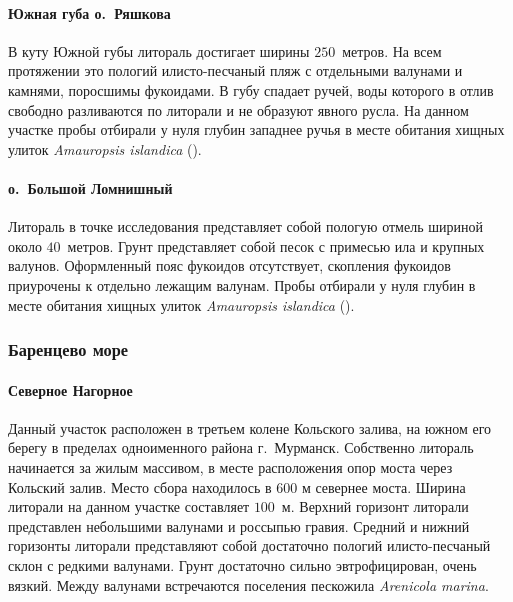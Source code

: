 \paragraph{Южная губа о.~Ряшкова}
В куту Южной губы литораль достигает ширины $250$~метров. 
На всем протяжении это пологий илисто-песчаный пляж с отдельными валунами и камнями, поросшимы фукоидами.
В губу спадает ручей, воды которого в отлив свободно разливаются по литорали и не образуют явного русла.
На данном участке пробы отбирали у нуля глубин западнее ручья в месте обитания хищных улиток \textit{Amauropsis islandica} (\cite{Aristov_Granovich_2011}).


\paragraph{о.~Большой Ломнишный}
Литораль в точке исследования представляет собой пологую отмель шириной около $40$~метров.
Грунт представляет собой песок с примесью ила и крупных валунов.
Оформленный пояс фукоидов отсутствует, скопления фукоидов приурочены к отдельно лежащим валунам.
Пробы отбирали у нуля глубин в месте обитания хищных улиток \textit{Amauropsis islandica} (\cite{Aristov_Granovich_2011}).



            \subsubsection{Баренцево море}

            \paragraph{Северное Нагорное}
Данный участок расположен в третьем колене Кольского залива, на южном его берегу в пределах одноименного района г.~Мурманск. 
Собственно литораль начинается за жилым массивом, в месте расположения опор моста через Кольский залив. 
Место сбора находилось в 600 м севернее моста. 
Ширина литорали на данном участке составляет $100$~м. 
Верхний горизонт литорали представлен небольшими валунами и россыпью гравия. 
Средний и нижний горизонты литорали представляют собой достаточно пологий илисто-песчаный склон с редкими валунами. 
Грунт достаточно сильно эвтрофицирован, очень вязкий. 
Между валунами встречаются поселения пескожила {\it Arenicola marina}.

